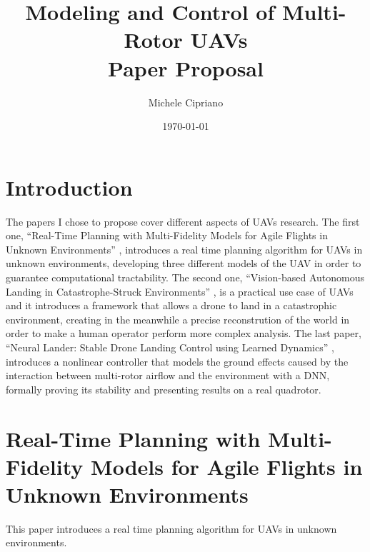 \documentclass[a4paper]{article}
\begin{document}
\sloppy

\title{Modeling and Control of Multi-Rotor UAVs\\Paper Proposal}
\author{Michele Cipriano}
\date{\today}
\maketitle



\section{Introduction}
The papers I chose to propose cover different aspects of UAVs research.
The first one, ``Real-Time Planning with Multi-Fidelity Models for Agile Flights
in Unknown Environments'' \cite{DBLP:journals/corr/abs-1810-01035}, introduces
a real time planning algorithm for UAVs in unknown environments, developing
three different models of the UAV in order to guarantee computational
tractability. The second one, ``Vision-based Autonomous Landing in
Catastrophe-Struck Environments'' \cite{DBLP:journals/corr/abs-1809-05700},
is a practical use case of UAVs and it introduces a framework that allows
a drone to land in a catastrophic environment, creating in the meanwhile
a precise reconstrution of the world in order to make a human operator
perform more complex analysis. The last paper,
``Neural Lander: Stable Drone Landing Control using Learned Dynamics''
\cite{DBLP:journals/corr/abs-1811-08027}, introduces a nonlinear controller
that models the ground effects caused by the interaction between
multi-rotor airflow and the environment with a DNN, formally proving its
stability and presenting results on a real quadrotor.

\section{Real-Time Planning with Multi-Fidelity Models for Agile Flights
    in Unknown Environments}
This paper \cite{DBLP:journals/corr/abs-1810-01035} introduces a real time
planning algorithm for UAVs in unknown environments.
\end{document}
